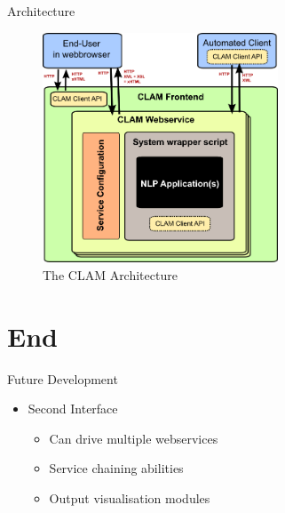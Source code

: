 \documentclass[compress]{beamer}
\begin{document}
\begin{frame}
    \begin{block}{Architecture}
        \begin{figure}[h]
        \begin{center}
        \includegraphics[width=70.0mm]{architecture.png}
        \end{center}
        \caption{The CLAM Architecture}
        \label{fig:arch} 
        \end{figure}

    \end{block}
\end{frame}

\section{End}

\begin{frame}
    \begin{block}{Future Development}
        \begin{itemize}
            \item Second Interface
            \begin{itemize}
                \item Can drive multiple webservices
                \item Service chaining abilities
                \item Output visualisation modules
            \end{itemize}
        \end{itemize}
    \end{block}
\end{frame}

\begin{frame}
    \raccoon
\end{frame}
\end{document}
